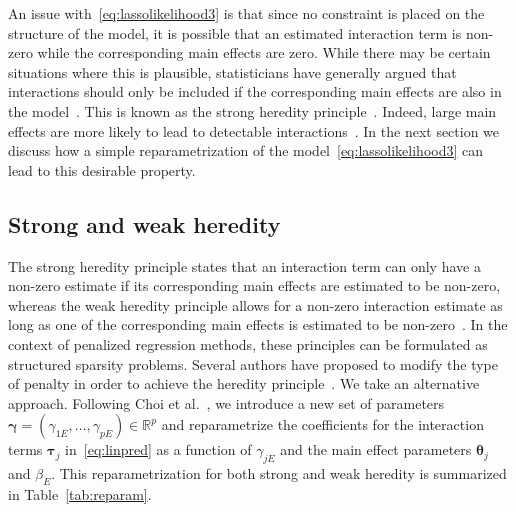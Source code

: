 \documentclass[a4paper,fleqn]{cas-sc}
\makeatletter
\newcommand{\tm}[1]{\textrm{{#1}}}
\newcommand{\balpha}{\boldsymbol{\alpha}}
\newcommand{\btau}{\boldsymbol{\tau}}
\newcommand{\bgamma}{\boldsymbol{\gamma}}
\newcommand{\btheta}{\boldsymbol{\theta}}
\DeclarePairedDelimiter\norm{\lVert}{\rVert}%
\let\oldnorm\norm
\def\norm{\@ifstar{\oldnorm}{\oldnorm*}}
\makeatother
\begin{document}
An issue with~\eqref{eq:lassolikelihood3} is that since no constraint is placed on the structure of the model, it is possible that an estimated interaction term is non-zero while the corresponding main effects are zero. While there may be certain situations where this is plausible, statisticians have generally argued that interactions should only be included if the corresponding main effects are also in the model~\citep{mccullagh1989generalized}. This is known as the strong heredity principle~\citep{chipman1996bayesian}. Indeed, large main effects are more likely to lead to detectable interactions~\citep{cox1984interaction}. In the next section we discuss how a simple reparametrization of the model~\eqref{eq:lassolikelihood3} can lead to this desirable property.

\subsection{Strong and weak heredity}

The strong heredity principle states that an interaction term can only have a non-zero estimate if its corresponding main effects are estimated to be non-zero, whereas the weak heredity principle allows for a non-zero interaction estimate as long as one of the corresponding main effects is estimated to be non-zero~\citep{chipman1996bayesian}. 
In the context of penalized regression methods, these principles can be formulated as structured sparsity \citep{bach2012structured} problems. 
Several authors have proposed to modify the type of penalty in order to achieve the heredity principle~\citep{radchenko2010variable,bien2013lasso,lim2015learning,haris2016convex}. 
We take an alternative approach. Following Choi et al.~\citep{choi2010variable}, we introduce a new set of parameters $\bgamma = (\gamma_{1E}, \ldots, \gamma_{pE})\in \mathbb{R}^p$ and reparametrize the coefficients for the interaction terms $\btau_j$ in~\eqref{eq:linpred} as a function of $\gamma_{jE}$ and the main effect parameters $\btheta_j$ and $\beta_E$. This reparametrization for both strong and weak heredity is summarized in Table~\ref{tab:reparam}.
\end{document}
